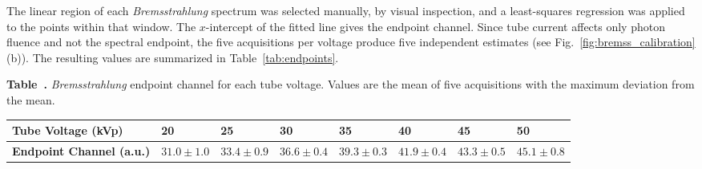 The linear region of each \emph{Bremsstrahlung} spectrum was selected manually, by visual inspection, and a least-squares regression was applied to the points within that window. The $x$-intercept of the fitted line gives the endpoint channel. Since tube current affects only photon fluence and not the spectral endpoint, the five acquisitions per voltage produce five independent estimates (see Fig.~\ref{fig:bremss_calibration} (b)). The resulting values are summarized in Table~\ref{tab:endpoints}.

\vspace{1em}

\label{tab:endpoints}
\noindent\textbf{Table~\thetable.} \emph{Bremsstrahlung} endpoint channel for each tube voltage. Values are the mean of five acquisitions with the maximum deviation from the mean.

\vspace{0.1em}

\begin{table}[H]
  \centering
  \begin{tabular}{>{\centering\arraybackslash}m{}
                  >{\centering\arraybackslash}m{}
                  >{\centering\arraybackslash}m{}
                  >{\centering\arraybackslash}m{}
                  >{\centering\arraybackslash}m{}
                  >{\centering\arraybackslash}m{}
                  >{\centering\arraybackslash}m{}
                  >{\centering\arraybackslash}m{}}
    \toprule
    \scriptsize \textbf{Tube Voltage (kVp)} & \scriptsize \textbf{20} & \scriptsize \textbf{25} & \scriptsize \textbf{30} & \scriptsize \textbf{35} & \scriptsize \textbf{40} & \scriptsize \textbf{45} & \scriptsize \textbf{50} \\
    \midrule
    \scriptsize \textbf{Endpoint Channel (a.u.)}
    & \scriptsize $31.0 \pm 1.0$
    & \scriptsize $33.4 \pm 0.9$
    & \scriptsize $36.6 \pm 0.4$
    & \scriptsize $39.3 \pm 0.3$
    & \scriptsize $41.9 \pm 0.4$
    & \scriptsize $43.3 \pm 0.5$
    & \scriptsize $45.1 \pm 0.8$ \\
    \bottomrule
  \end{tabular}
\end{table}

